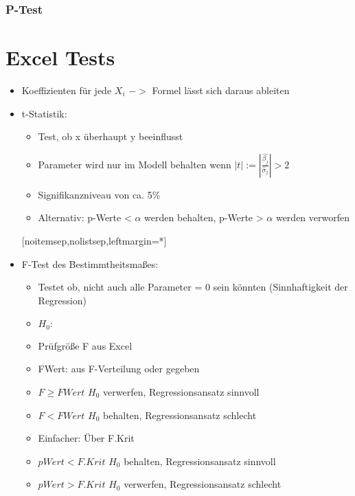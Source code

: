 \documentclass[a4paper]{article}
\begin{document}
\begin{landscape}
\begin{multicols}{4}
        \subsubsection*{P-Test}

    \section*{Excel Tests}
    \begin{itemize}[noitemsep,nolistsep,leftmargin=*]
        \item Koeffizienten für jede $X_i$ $->$ Formel lässt sich daraus ableiten
        \item t-Statistik:
        \begin{itemize}
            \item Test, ob x überhaupt y beeinflusst
            \item Parameter wird nur im Modell behalten wenn $|t| := |\frac{\hat{\beta_j}}{\hat{\sigma}_j}| > 2$
            \item Signifikanzniveau von ca. 5\%
            \item Alternativ: p-Werte < $\alpha$ werden behalten, p-Werte > $\alpha$ werden verworfen
        \end{itemize}[noitemsep,nolistsep,leftmargin=*]
        \item F-Test des Bestimmtheitsmaßes:
        \begin{itemize}[noitemsep,nolistsep,leftmargin=*]
            \item Testet ob, nicht auch alle Parameter = 0 sein könnten (Sinnhaftigkeit der Regression)
            \item $H_0: $
            \item Prüfgröße F aus Excel
            \item FWert: aus F-Verteilung oder gegeben
            \item $F  \geq FWert$ $H_0$ verwerfen, Regressionsansatz sinnvoll
            \item $F < FWert$ $H_0$ behalten, Regressionsansatz schlecht
            \item Einfacher: Über  F.Krit
            \item $p Wert < F.Krit$ $H_0$ behalten, Regressionsansatz sinnvoll
            \item $p Wert > F.Krit$ $H_0$ verwerfen, Regressionsansatz schlecht
        \end{itemize}
    \end{itemize}


\end{multicols}
\end{landscape}
\end{document}
